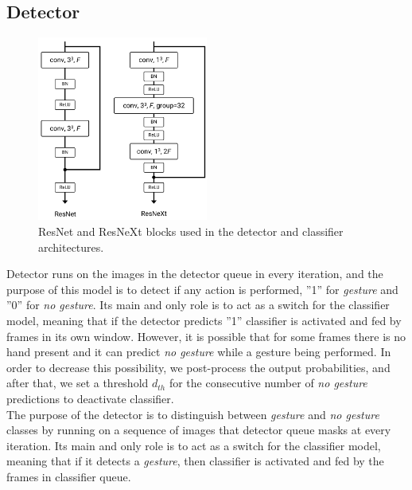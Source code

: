 \subsection{Detector}
\label{subsec:detector}
\begin{figure}[t!]
	\centering
	\includegraphics[width=0.5\textwidth]{figures/blocks}
	\caption{ResNet and ResNeXt blocks used in the detector and classifier architectures.}
	\label{fig:blocks}
\end{figure}
Detector runs on the images in the detector queue in every iteration, and the purpose of this model is to detect if any action is performed,  ”1” for \textit{gesture} and ”0” for \textit{no gesture}.  Its main and only role is to act as a switch for the classifier model, meaning that if the detector predicts ”1” classifier is activated and fed by frames in its own window. However, it is possible that for some frames there is no hand present and it can predict \textit{no gesture} while a gesture being performed.  In order to decrease this possibility, we post-process the output probabilities, and after that, we set a threshold $d_{th}$ for the consecutive number of \textit{no gesture} predictions to deactivate classifier.\\

The purpose of the detector is to distinguish between \textit{gesture} and \textit{no gesture} classes by running on a sequence of images that detector queue masks at every iteration. Its main and only role is to act as a switch for the classifier model, meaning that if it detects a \textit{gesture}, then classifier is activated and fed by the frames in classifier queue.\\

